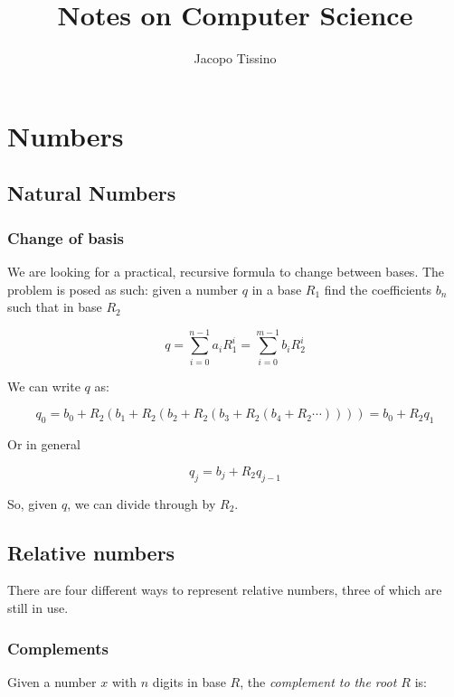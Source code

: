 \documentclass[12pt,a4paper]{report}
\author{Jacopo Tissino}
\title{Notes on Computer Science}
\numberwithin{equation}{section}
\theoremstyle{definition}
\theoremstyle{remark}
\begin{document}
\maketitle

\chapter{Numbers}

\section{Natural Numbers}

\subsection{Change of basis}

We are looking for a practical, recursive formula to change between bases. The problem is posed as such: given a number $q$ in a base $R_1$ find the coefficients $b_n$ such that in base $R_2$

\begin{equation}
q = \sum_{i=0}^{n-1} a_i R_1^i = \sum_{i=0}^{m-1} b_i R_2^i
\end{equation}

We can write $q$ as:

\begin{equation}
q_0 = b_0 +  R_2 \left( b_1 + R_2 \left( b_2 + R_2 \left( b_3 + R_2 \left( b_4 + R_2 \cdots \right)\right)\right)\right) = b_0 + R_2 q_1
\end{equation}

Or in general

\begin{equation}
q_j = b_j + R_2 q_{j-1}
\end{equation}

So, given $q$, we can divide through by $R_2$.

\section{Relative numbers}

There are four different ways to represent relative numbers, three of which are still in use.

\subsection{Complements} Given a number $x$ with $n$ digits in base $R$, the \emph{complement to the root $R$} is:
\end{document}
